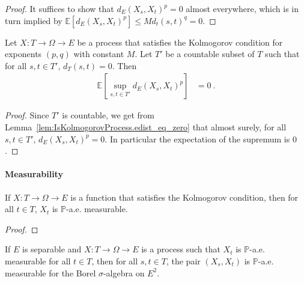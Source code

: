 \begin{proof}\leanok
It suffices to show that $d_E(X_s, X_t)^p = 0$ almost everywhere, which is in turn implied by $\mathbb{E}[d_E(X_s, X_t)^p] \le M d_t(s, t)^q = 0$.
\end{proof}


\begin{lemma}\label{lem:IsKolmogorovProcess.lintegral_sup_rpow_edist_eq_zero}
  \leanok
Let $X : T \to \Omega \to E$ be a process that satisfies the Kolmogorov condition for exponents $(p,q)$ with constant $M$.
Let $T'$ be a countable subset of $T$ such that for all $s, t \in T'$, $d_T(s, t) = 0$.
Then
\begin{align*}
  \mathbb{E}\left[ \sup_{s, t \in T'} d_E(X_s, X_t)^p \right]
  &= 0
  \: .
\end{align*}
\end{lemma}

\begin{proof}\leanok
Since $T'$ is countable, we get from Lemma~\ref{lem:IsKolmogorovProcess.edist_eq_zero} that almost surely, for all $s, t \in T'$, $d_E(X_s, X_t)^p = 0$.
In particular the expectation of the supremum is $0$.
\end{proof}


\paragraph{Measurability}

\begin{lemma}\label{lem:IsKolmogorovProcess.aemeasurable}
  \leanok
If $X : T \to \Omega \to E$ is a function that satisfies the Kolmogorov condition, then for all $t \in T$, $X_t$ is $\mathbb{P}$-a.e. measurable.
\end{lemma}

\begin{proof}\leanok

\end{proof}


\begin{lemma}\label{lem:aemeasurable_pair_of_aemeasurable}
  \leanok
If $E$ is separable and $X : T \to \Omega \to E$ is a process such that $X_t$ is $\mathbb{P}$-a.e. measurable for all $t \in T$, then for all $s, t \in T$, the pair $(X_s, X_t)$ is $\mathbb{P}$-a.e. measurable for the Borel $\sigma$-algebra on $E^2$.
\end{lemma}

